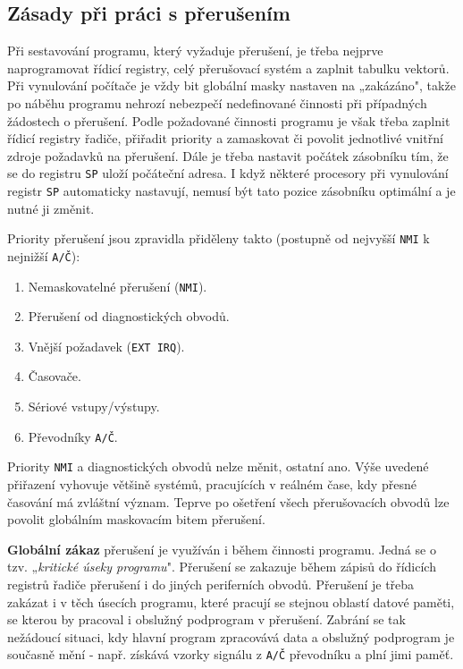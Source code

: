     \subsection{Zásady při práci s přerušením}
      Při sestavování programu, který vyžaduje přerušení, je třeba nejprve naprogramovat řídicí 
      registry, celý přerušovací systém a zaplnit tabulku vektorů. Při vynulování počítače je vždy 
      bit globální masky nastaven na „zakázáno", takže po náběhu programu nehrozí nebezpečí 
      nedefinované činnosti při případných žádostech o přerušení. Podle požadované činnosti 
      programu je však třeba zaplnit řídicí registry řadiče, přiřadit priority a zamaskovat či 
      povolit jednotlivé vnitřní zdroje požadavků na přerušení. Dále je třeba nastavit počátek 
      zásobníku tím, že se do registru \texttt{SP} uloží počáteční adresa. I když některé procesory 
      při vynulování registr \texttt{SP} automaticky nastavují, nemusí být tato pozice zásobníku 
      optimální a je nutné ji změnit.
      
      Priority přerušení jsou zpravidla přiděleny takto (postupně od nejvyšší \texttt{NMI} k 
      nejnižší \texttt{A/Č}):
      \begin{enumerate}[noitemsep]
        \item Nemaskovatelné přerušení (\texttt{NMI}).
        \item Přerušení od diagnostických obvodů.
        \item Vnější požadavek (\texttt{EXT IRQ}).
        \item Časovače.
        \item Sériové vstupy/výstupy.
        \item Převodníky \texttt{A/Č}.
      \end{enumerate}
      
      Priority \texttt{NMI} a diagnostických obvodů nelze měnit, ostatní ano. Výše uvedené 
      přiřazení vyhovuje většině systémů, pracujících v reálném čase, kdy přesné časování má 
      zvláštní význam. Teprve po ošetření všech přerušovacích obvodů lze povolit globálním 
      maskovacím bitem přerušení.
      
      \textbf{Globální zákaz} přerušení je využíván i během činnosti programu. Jedná se o tzv. 
      „\emph{kritické úseky programu}". Přerušení se zakazuje během zápisů do řídicích registrů 
      řadiče přerušení i do jiných periferních obvodů. Přerušení je třeba zakázat i v těch úsecích 
      programu, které pracují se stejnou oblastí datové paměti, se kterou by pracoval i obslužný 
      podprogram v přerušení. Zabrání se tak nežádoucí situaci, kdy hlavní program zpracovává data 
      a obslužný podprogram je současně mění - např. získává vzorky signálu z \texttt{A/Č} 
      převodníku a plní jimi paměť. 
      
